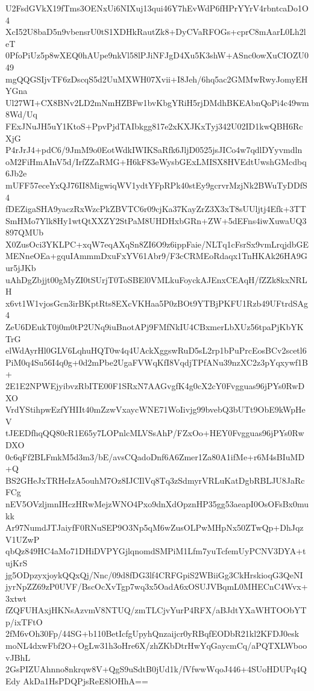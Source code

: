 U2FsdGVkX19fTms3OENxUi6NIXuj13qui46Y7hEvWdP6fHPrYYrV4rbntcaDo1O4
XcI52U8baD5n9vbensrU0tS1XDHkRautZk8+DyCVaRFOGs+cprC8mAarL0Lh2leT
0PfoPiUz5p8wXEQ0hAUpe9nkVl58lPJiNFJgD4Xu5K3shW+ASnc0owXuCIOZU049
mgQQGSIjvTF6zDscqS5d2UuMXWH07Xvii+I8Jeh/6hq5ac2GMMwRwyJomyEHYGna
Ul27WI+CX8BNv2LD2mNmHZBFw1bvKbgYRiH5rjDMdhBKEAbnQoPi4c49wm8Wd/Uq
FExJNuJH5uY1KtoS+PpvPjdTAIbkgg817e2xKXJKxTyj342U02ID1kwQBH6RcXjG
P4rJrJ4+pdC6/9JmM9o0EotWdkIWIKSaRfk6JljD0525jsJICo4w7qdlDYyvmdln
oM2FiHmAInV5d/IrfZZaRMG+H6kF83eWysbGExLMISX8HVEdtUwshGMcdbq6Jb2e
mUFF57eceYxQJ76II8MigwiqWV1ydtYFpRPk40stEy9gcrvrMzjNk2BWuTyDDfS4
fDEZigaSHA9yaczRxWzcPkZBVTC6r09cjKa37KayZrZ3X3xT8sUUljtj4Efk+3TT
SmHMo7Ylk8Hy1wtQtXXZY2StPaM8UHDHxbGRn+ZW+5dEFns4iwXuwaUQ3897QMUb
X0ZusOci3YKLPC+xqW7eqAXqSn8ZI6O9z6ippFaie/NLTq1cFsrSx9vmLrqjdbGE
MENneOEa+gquIAmmmDxuFxYV61Abr9/F3cCRMEoRdaqx1TnHKAk26HA9Gur5jJKb
uAhDgZbjjt00gMyZI0tSUrjT0ToSBEl0VMLkuFoyckAJEnxCEAqH/fZZk8kxNRLH
x6vt1W1vjosGcn3irBKptRts8EXcVKHaa5P0zBOt9YTBjPKFU1Rzb49UFtrdSAg4
ZeU6DEukT0j0m0tP2UNq9iuBnotAPj9FMfNkIU4CBxmerLbXUz56tpaPjKbYKTrG
elWdAyrHl0GLV6LqhuHQT0w4q4UAckXggswRuD5sL2rp1bPuPrcEosBCv2scetl6
PiM0q4Su56I4q0g+0d2mPbe2UgaFVWqKfI8VqdjTPfANu39nzXC2z3pYqxywf1B+
2E1E2NPWEjyibvzRbITE00F1SRxN7AAGvgfK4g0cX2cY0Fvgguas96jPYs0RwDXO
VrdYStihpwEzfYHIIt40mZzwVxaycWNE71WoIivjg99bvebQ3bUTt9ObE9kWpHeV
tJEEDfhqQQ80cR1E65y7LOPnlcMLVSsAhP/FZxOo+HEY0Fvgguas96jPYs0RwDXO
0c6qFf2BLFmkM5d3m3/bE/avsCQadoDnf6A6Zmer1Za80A1ifMe+r6M4sBIuMD+Q
BS2GHeJxTRHeIzA5ouhM7Oz8IJCIlVq8Tq3zSdmyrVRLuKatDgbRBLJU8JaRcFCg
nEV5OVzljmnIHczHRwMejzWNO4Pxo9dnXdOpznHP35gg53aeapI0OsOFsBx0mukk
Ar97NumdJTJaiyfF0RNuSEP9O3Np5qM6wZusOLPwMHpNx50ZTwQp+DhJqzV1UZwP
qbQz849HC4aMo71DHiDVPYGjlqnomdSMPiM1Lfm7yuTcfemUyPCNV3DYA+tujKrS
jg5ODpzyxjoykQQxQj/Nnc/09d8fDG3lf4CRFGpiS2WBiiGg3CkHrskioqG3QeNI
jyrNpZZ69zP0UVF/BscOcXvTgp7wq3x5OadA6xOSUJVBqmL0MHECnC4Wvx+3xtwt
fZQFUHAxjHKNsAzvmV8NTUQ/zmTLCjvYurP4RFX/aBJdtYXaWHTOObYTp/ixTFtO
2fM6vOh30Fp/44SG+b110BetIcfgUpyhQnzaijcr0yRBqfEODbR21kl2KFDJ0esk
moNL4dxwFbf2O+OgLw31h3oHre6X/zhZKbDtrHwYqGaycmCq/aPQTXLWboovJBhL
2GsPIZUAhnno8nkrqw8V+QgS9uSdtB0jUd1k/fVfwwWqoJ446+4SUoHDUPq4QEdy
AkDa1HsPDQPjsReE8lOHhA==

